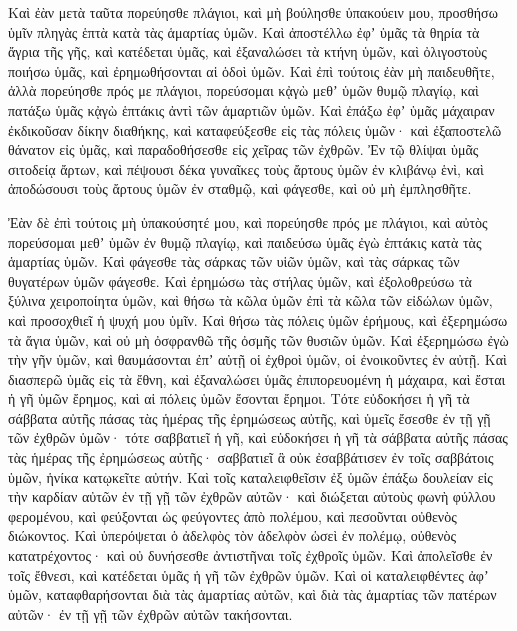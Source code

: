 {\par }{\PP {}Καὶ ἐὰν μετὰ ταῦτα πορεύησθε πλάγιοι, καὶ μὴ βούλησθε ὑπακούειν μου, προσθήσω ὑμῖν πληγὰς ἑπτὰ κατὰ τὰς ἁμαρτίας ὑμῶν.
Καὶ ἀποστέλλω ἐφʼ ὑμᾶς τὰ θηρία τὰ ἄγρια τῆς γῆς, καὶ κατέδεται ὑμᾶς, καὶ ἐξαναλώσει τὰ κτήνη ὑμῶν, καὶ ὀλιγοστοὺς ποιήσω ὑμᾶς, καὶ ἐρημωθήσονται αἱ ὁδοὶ ὑμῶν.
Καὶ ἐπὶ τούτοις ἐὰν μὴ παιδευθῆτε, ἀλλὰ πορεύησθε πρός με πλάγιοι,
πορεύσομαι κᾀγὼ μεθʼ ὑμῶν θυμῷ πλαγίῳ, καὶ πατάξω ὑμᾶς κᾀγὼ ἑπτάκις ἀντὶ τῶν ἁμαρτιῶν ὑμῶν.
Καὶ ἐπάξω ἐφʼ ὑμᾶς μάχαιραν ἐκδικοῦσαν δίκην διαθήκης, καὶ καταφεύξεσθε εἰς τὰς πόλεις ὑμῶν· καὶ ἐξαποστελῶ θάνατον εἰς ὑμᾶς, καὶ παραδοθήσεσθε εἰς χεῖρας τῶν ἐχθρῶν.
Ἐν τῷ θλίψαι ὑμᾶς σιτοδείᾳ ἄρτων, καὶ πέψουσι δέκα γυναῖκες τοὺς ἄρτους ὑμῶν ἐν κλιβάνῳ ἑνὶ, καὶ ἀποδώσουσι τοὺς ἄρτους ὑμῶν ἐν σταθμῷ, καὶ φάγεσθε, καὶ οὐ μὴ ἐμπλησθῆτε.
\par }{\PP {}Ἐὰν δὲ ἐπὶ τούτοις μὴ ὑπακούσητέ μου, καὶ πορεύησθε πρός με πλάγιοι,
καὶ αὐτὸς πορεύσομαι μεθʼ ὑμῶν ἐν θυμῷ πλαγίῳ, καὶ παιδεύσω ὑμᾶς ἐγὼ ἑπτάκις κατὰ τὰς ἁμαρτίας ὑμῶν.
Καὶ φάγεσθε τὰς σάρκας τῶν υἱῶν ὑμῶν, καὶ τὰς σάρκας τῶν θυγατέρων ὑμῶν φάγεσθε.
Καὶ ἐρημώσω τὰς στήλας ὑμῶν, καὶ ἐξολοθρεύσω τὰ ξύλινα χειροποίητα ὑμῶν, καὶ θήσω τὰ κῶλα ὑμῶν ἐπὶ τὰ κῶλα τῶν εἰδώλων ὑμῶν, καὶ προσοχθιεῖ ἡ ψυχή μου ὑμῖν.
Καὶ θήσω τὰς πόλεις ὑμῶν ἐρήμους, καὶ ἐξερημώσω τὰ ἅγια ὑμῶν, καὶ οὐ μὴ ὀσφρανθῶ τῆς ὀσμῆς τῶν θυσιῶν ὑμῶν.
Καὶ ἐξερημώσω ἐγὼ τὴν γῆν ὑμῶν, καὶ θαυμάσονται ἐπʼ αὐτῇ οἱ ἐχθροὶ ὑμῶν, οἱ ἐνοικοῦντες ἐν αὐτῇ.
Καὶ διασπερῶ ὑμᾶς εἰς τὰ ἔθνη, καὶ ἐξαναλώσει ὑμᾶς ἐπιπορευομένη ἡ μάχαιρα, καὶ ἔσται ἡ γῆ ὑμῶν ἔρημος, καὶ αἱ πόλεις ὑμῶν ἔσονται ἔρημοι.
Τότε εὐδοκήσει ἡ γῆ τὰ σάββατα αὐτῆς πάσας τὰς ἡμέρας τῆς ἐρημώσεως αὐτῆς,
καὶ ὑμεῖς ἔσεσθε ἐν τῇ γῇ τῶν ἐχθρῶν ὑμῶν· τότε σαββατιεῖ ἡ γῆ, καὶ εὐδοκήσει ἡ γῆ τὰ σάββατα αὐτῆς πάσας τὰς ἡμέρας τῆς ἐρημώσεως αὐτῆς· σαββατιεῖ ἃ οὐκ ἐσαββάτισεν ἐν τοῖς σαββάτοις ὑμῶν, ἡνίκα κατῳκεῖτε αὐτήν.
Καὶ τοῖς καταλειφθεῖσιν ἐξ ὑμῶν ἐπάξω δουλείαν εἰς τὴν καρδίαν αὐτῶν ἐν τῇ γῇ τῶν ἐχθρῶν αὐτῶν· καὶ διώξεται αὐτοὺς φωνὴ φύλλου φερομένου, καὶ φεύξονται ὡς φεύγοντες ἀπὸ πολέμου, καὶ πεσοῦνται οὐθενὸς διώκοντος.
Καὶ ὑπερόψεται ὁ ἀδελφὸς τὸν ἀδελφὸν ὡσεὶ ἐν πολέμῳ, οὐθενὸς κατατρέχοντος· καὶ οὐ δυνήσεσθε ἀντιστῆναι τοῖς ἐχθροῖς ὑμῶν.
Καὶ ἀπολεῖσθε ἐν τοῖς ἔθνεσι, καὶ κατέδεται ὑμᾶς ἡ γῆ τῶν ἐχθρῶν ὑμῶν.
Καὶ οἱ καταλειφθέντες ἀφʼ ὑμῶν, καταφθαρήσονται διὰ τὰς ἁμαρτίας αὐτῶν, καὶ διὰ τὰς ἁμαρτίας τῶν πατέρων αὐτῶν· ἐν τῇ γῇ τῶν ἐχθρῶν αὐτῶν τακήσονται.
}
